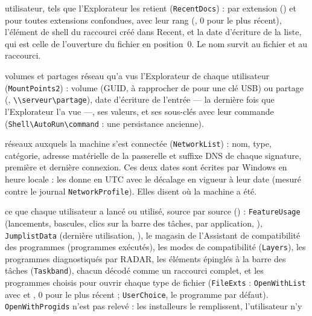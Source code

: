 \documentclass[11pt,a4paper,oneside]{report}
\begin{document}
\begin{description}[style=nextline,leftmargin=1.2em]
        utilisateur, tels que l'Explorateur les retient (\texttt{RecentDocs}) :
        par extension () et pour toutes extensions confondues,
        avec leur rang (, 0 pour le plus récent), l'élément de
        shell du raccourci créé dans Recent, et la date d'écriture de la liste,
        qui est celle de l'ouverture du fichier en position~0. Le nom survit au
        fichier et au raccourci.
  \item[\fichier{mount\_points.json}] volumes et partages réseau qu'a vus
        l'Explorateur de chaque utilisateur (\texttt{MountPoints2}) : volume
        (GUID, à rapprocher de  pour une clé USB)
        ou partage (, \texttt{\textbackslash\textbackslash serveur\textbackslash partage}),
        date d'écriture de l'entrée --- la dernière fois que l'Explorateur l'a
        vue ---, ses valeurs, et ses sous-clés avec leur commande
        (\texttt{Shell\textbackslash AutoRun\textbackslash command} : une
        persistance ancienne).
  \item[\fichier{known\_networks.json}] réseaux auxquels la machine s'est
        connectée (\texttt{NetworkList}) : nom, type, catégorie, adresse
        matérielle de la passerelle et suffixe DNS de chaque signature, première
        et dernière connexion. Ces deux dates sont écrites par Windows en heure
        locale : \wac{} les donne en UTC avec le décalage en vigueur à leur
        date (mesuré contre le journal \texttt{NetworkProfile}). Elles disent où
        la machine a été.
  \item[\fichier{program\_usage.json}] ce que chaque utilisateur a lancé ou
        utilisé, source par source () : \texttt{FeatureUsage}
        (lancements, bascules, clics sur la barre des tâches, par application,
        ), \texttt{JumplistData} (dernière utilisation,
        ), le magasin de l'Assistant de compatibilité des
        programmes (programmes exécutés), les modes de compatibilité
        (\texttt{Layers}), les programmes diagnostiqués par RADAR, les éléments
        épinglés à la barre des tâches (\texttt{Taskband}), chacun décodé comme
        un raccourci complet, et les programmes choisis pour ouvrir chaque type
        de fichier (\texttt{FileExts} : \texttt{OpenWithList} avec
         et , 0 pour le plus récent ;
        \texttt{UserChoice}, le programme par défaut). \texttt{OpenWithProgids}
        n'est pas relevé : les installeurs le remplissent, l'utilisateur n'y

\end{description}
\end{document}
